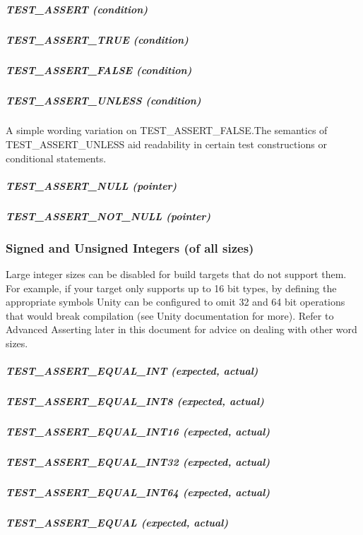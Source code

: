\subparagraph*{{\ttfamily T\+E\+S\+T\+\_\+\+A\+S\+S\+E\+RT (condition)}}

\subparagraph*{{\ttfamily T\+E\+S\+T\+\_\+\+A\+S\+S\+E\+R\+T\+\_\+\+T\+R\+UE (condition)}}

\subparagraph*{{\ttfamily T\+E\+S\+T\+\_\+\+A\+S\+S\+E\+R\+T\+\_\+\+F\+A\+L\+SE (condition)}}

\subparagraph*{{\ttfamily T\+E\+S\+T\+\_\+\+A\+S\+S\+E\+R\+T\+\_\+\+U\+N\+L\+E\+SS (condition)}}

A simple wording variation on {\ttfamily T\+E\+S\+T\+\_\+\+A\+S\+S\+E\+R\+T\+\_\+\+F\+A\+L\+SE}.The semantics of {\ttfamily T\+E\+S\+T\+\_\+\+A\+S\+S\+E\+R\+T\+\_\+\+U\+N\+L\+E\+SS} aid readability in certain test constructions or conditional statements.

\subparagraph*{{\ttfamily T\+E\+S\+T\+\_\+\+A\+S\+S\+E\+R\+T\+\_\+\+N\+U\+LL (pointer)}}

\subparagraph*{{\ttfamily T\+E\+S\+T\+\_\+\+A\+S\+S\+E\+R\+T\+\_\+\+N\+O\+T\+\_\+\+N\+U\+LL (pointer)}}

\subsubsection*{Signed and Unsigned Integers (of all sizes)}

Large integer sizes can be disabled for build targets that do not support them. For example, if your target only supports up to 16 bit types, by defining the appropriate symbols Unity can be configured to omit 32 and 64 bit operations that would break compilation (see Unity documentation for more). Refer to Advanced Asserting later in this document for advice on dealing with other word sizes.

\subparagraph*{{\ttfamily T\+E\+S\+T\+\_\+\+A\+S\+S\+E\+R\+T\+\_\+\+E\+Q\+U\+A\+L\+\_\+\+I\+NT (expected, actual)}}

\subparagraph*{{\ttfamily T\+E\+S\+T\+\_\+\+A\+S\+S\+E\+R\+T\+\_\+\+E\+Q\+U\+A\+L\+\_\+\+I\+N\+T8 (expected, actual)}}

\subparagraph*{{\ttfamily T\+E\+S\+T\+\_\+\+A\+S\+S\+E\+R\+T\+\_\+\+E\+Q\+U\+A\+L\+\_\+\+I\+N\+T16 (expected, actual)}}

\subparagraph*{{\ttfamily T\+E\+S\+T\+\_\+\+A\+S\+S\+E\+R\+T\+\_\+\+E\+Q\+U\+A\+L\+\_\+\+I\+N\+T32 (expected, actual)}}

\subparagraph*{{\ttfamily T\+E\+S\+T\+\_\+\+A\+S\+S\+E\+R\+T\+\_\+\+E\+Q\+U\+A\+L\+\_\+\+I\+N\+T64 (expected, actual)}}

\subparagraph*{{\ttfamily T\+E\+S\+T\+\_\+\+A\+S\+S\+E\+R\+T\+\_\+\+E\+Q\+U\+AL (expected, actual)}}

